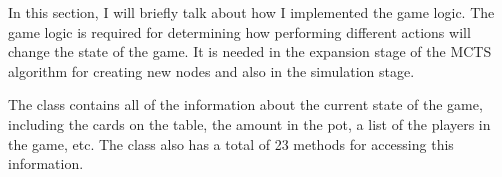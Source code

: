 

In this section, I will briefly talk about how I implemented the game logic. The game logic is required for determining how performing different actions will change the state of the game. It is needed in the expansion stage of the MCTS algorithm for creating new nodes and also in the simulation stage. 

The \gs class contains all of the information about the current state of the game, including the cards on the table, the amount in the pot, a list of the players in the game, etc. The class also has a total of 23 methods for accessing this information. 

